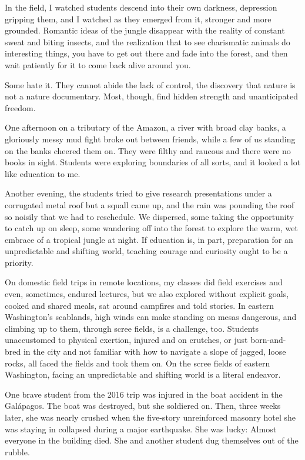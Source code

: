 In the field, I watched students descend into their own darkness,
depression gripping them, and I watched as they emerged from it,
stronger and more grounded. Romantic ideas of the jungle disappear with
the reality of constant sweat and biting insects, and the realization
that to see charismatic animals do interesting things, you have to get
out there and fade into the forest, and then wait patiently for it to
come back alive around you.

Some hate it. They cannot abide the lack of control, the discovery that
nature is not a nature documentary. Most, though, find hidden strength
and unanticipated freedom.

One afternoon on a tributary of the Amazon, a river with broad clay
banks, a gloriously messy mud fight broke out between friends, while a
few of us standing on the banks cheered them on. They were filthy and
raucous and there were no books in sight. Students were exploring
boundaries of all sorts, and it looked a lot like education to me.

Another evening, the students tried to give research presentations under
a corrugated metal roof but a squall came up, and the rain was pounding
the roof so noisily that we had to reschedule. We dispersed, some taking
the opportunity to catch up on sleep, some wandering off into the forest
to explore the warm, wet embrace of a tropical jungle at night. If
education is, in part, preparation for an unpredictable and shifting
world, teaching courage and curiosity ought to be a priority.

On domestic field trips in remote locations, my classes did field
exercises and even, sometimes, endured lectures, but we also explored
without explicit goals, cooked and shared meals, sat around campfires
and told stories. In eastern Washington's scablands, high winds can make
standing on mesas dangerous, and climbing up to them, through scree
fields, is a challenge, too. Students unaccustomed to physical exertion,
injured and on crutches, or just born-and-bred in the city and not
familiar with how to navigate a slope of jagged, loose rocks, all faced
the fields and took them on. On the scree fields of eastern Washington,
facing an unpredictable and shifting world is a literal endeavor.

One brave student from the 2016 trip was injured in the boat accident in
the Galápagos. The boat was destroyed, but she soldiered on. Then, three
weeks later, she was nearly crushed when the five-story unreinforced
masonry hotel she was staying in collapsed during a major earthquake.
She was lucky: Almost everyone in the building died. She and another
student dug themselves out of the rubble.

